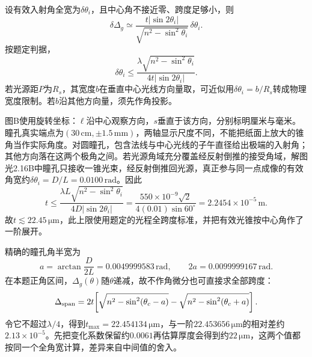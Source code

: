 \documentclass[UTF8,fontset=fandol,a4paper,11pt]{ctexart}
\newcommand{\figcaption}[1]{\par\vspace{2pt}{\small\color{muted}#1}\par}
\begin{document}
设有效入射角全宽为$\delta\theta_i$，且中心角不接近零、跨度足够小，则
\[
\delta\Delta_g\simeq
\frac{t|\sin2\theta_i|}{\sqrt{n^2-\sin^2\theta_i}}\,
\delta\theta_i.
\]
按题定判据，
\[
\boxed{\delta\theta_i\le
\frac{\lambda\sqrt{n^2-\sin^2\theta_i}}
{4t|\sin2\theta_i|}}.
\]
若光源距$P$为$R_s$，其宽度$b$在垂直中心光线方向量取，可近似用$\delta\theta_i=b/R_s$转成物理宽度限制。若$b$沿其他方向量，须先作角投影。

图B使用旋转坐标：$\ell$沿中心观察方向，$s$垂直于该方向，分别标明厘米与毫米。瞳孔真实端点为$(30\,\mathrm{cm},\pm1.5\,\mathrm{mm})$，两轴显示尺度不同，不能把纸面上放大的锥角当作实际角度。对圆瞳孔，包含法线与中心光线的子午直径给出极端的入射角；其他方向落在这两个极角之间。若光源角域充分覆盖经反射倒推的接受角域，解图光2.16B中瞳孔只接收一锥光束，经反射倒推回光源，真正参与同一点成像的有效角宽约$\delta\theta_i=D/L=0.0100\,\mathrm{rad}$。因此
\[
t\le\frac{\lambda L\sqrt{n^2-\sin^2\theta_i}}
{4D|\sin2\theta_i|}
=\frac{550\times10^{-9}\sqrt2}{4(0.01)\sin60^\circ}
=2.2454\times10^{-5}\,\mathrm m.
\]
故$\boxed{t\lesssim22.45\,\mathrm{\mu m}}$，此上限使用题定的光程全跨度标准，并把有效光锥按中心角作了一阶展开。
\begin{center}\begin{minipage}{.98\linewidth}\centering
{}
\figcaption{解图光2.16B\quad 真实瞳孔端点与分轴单位}
\end{minipage}\end{center}
精确的瞳孔角半宽为
\[
a=\arctan\frac{D}{2L}=0.0049999583\,\mathrm{rad},
\qquad 2a=0.0099999167\,\mathrm{rad}.
\]
在本题正角区间，$\Delta_g(\theta)$随$\theta$递减，故不作角微分也可直接求全部跨度：
\[
\Delta_{\rm span}
=2t\!\left[
\sqrt{n^2-\sin^2(\theta_c-a)}
-\sqrt{n^2-\sin^2(\theta_c+a)}
\right].
\]
令它不超过$\lambda/4$，得到$t_{\max}=22.454134\,\mathrm{\mu m}$，与一阶$22.453656\,\mathrm{\mu m}$的相对差约$2.13\times10^{-5}$。先把变化系数保留约$0.0061$再估算厚度会得到约$22\,\mathrm{\mu m}$，这两个值都按同一个全角宽计算，差异来自中间值的舍入。
\end{document}
